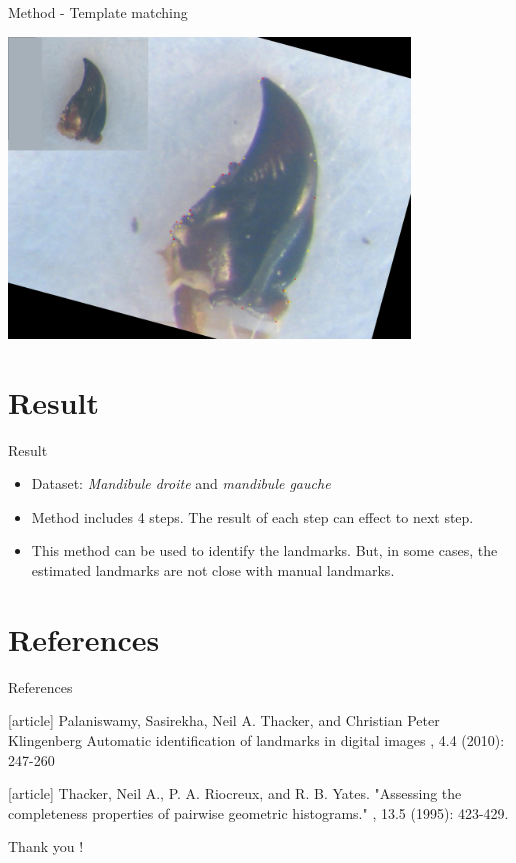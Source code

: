\documentclass{beamer}
\begin{document}
\begin{frame}{Method - Template matching}
	\begin{center}
		\includegraphics[height=8cm]{images/est19.JPG}	
	\end{center}
\end{frame}
\section{Result}
\begin{frame}{Result}
	\begin{itemize}
		\item Dataset: \textit{Mandibule droite} and \textit{mandibule gauche}
		\item Method includes 4 steps. The result of each step can effect to next step.
		\item This method can be used to identify the landmarks. But, in some cases, the estimated landmarks are not close with manual landmarks.
	\end{itemize}
\end{frame}
\section{References}
\begin{frame}[allowframebreaks]{References}
	\begin{thebibliography}{10}
		[article]
		Palaniswamy, Sasirekha, Neil A. Thacker, and Christian Peter Klingenberg
		\newblock Automatic identification of landmarks in digital images
		, 4.4 (2010): 247-260
		
		[article]		
		Thacker, Neil A., P. A. Riocreux, and R. B. Yates. 
		\newblock "Assessing the completeness properties of pairwise geometric histograms." 
		, 13.5 (1995): 423-429.
	\end{thebibliography}
\end{frame}
\begin{frame}[plain]
  \Huge{\centerline{Thank you !}}
\end{frame}
\end{document}
